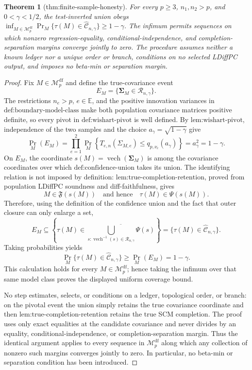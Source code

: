 \documentclass{article}
\newtheorem{theorem}{Theorem}
\begin{document}
\begin{theorem}[thm:finite-sample-honesty]\label{thm:finite-sample-honesty}
For every \(p\ge3\), \(n_1,n_2>p\), and \(0<\gamma<1/2\), the test-inverted union obeys \(\inf_{M\in\mathcal M_p^{\mathrm{df}}}\Pr_M\{\tau(M)\in\widehat{\mathcal C}_{n,\gamma}\}\ge1-\gamma\). The infimum permits sequences on which nonzero regression-equality, conditional-independence, and completion-separation margins converge jointly to zero. The procedure assumes neither a known ledger nor a unique order or branch, conditions on no selected LDiffPC output, and imposes no beta-min or separation margin.
\end{theorem}
\begin{proof}
Fix \(M\in\mathcal M_p^{\mathrm{df}}\) and define the true-covariance event
\[
E_M=\{\boldsymbol\Sigma_M\in\mathcal R_{n,\gamma}\}.
\]
The restrictions \(n_e>p\), \(e\in\mathbb E\), and the positive innovation variances in \(\text{def:boundary-model-class}\) make both population covariance matrices positive definite, so every pivot in \(\text{def:wishart-pivot}\) is well defined.  By \(\text{lem:wishart-pivot}\), independence of the two samples and the choice \(a_\gamma=\sqrt{1-\gamma}\) give
\[
\Pr_M(E_M)
=\prod_{e=1}^2
  \Pr_M\!\left\{T_{e,n}(\Sigma_{M,e})
       \le q_{p,\nu_e}(a_\gamma)\right\}
=a_\gamma^2
=1-\gamma.
\]
On \(E_M\), the coordinate \(s(M)=\operatorname{vech}(\boldsymbol\Sigma_M)\) is among the covariance coordinates over which \(\text{def:confidence-union}\) takes its union.  The identifying relation is not imposed by definition: \(\text{lem:true-completion-retention}\), proved from population LDiffPC soundness and diff-faithfulness, gives
\[
M\in\mathfrak F(s(M))
\quad\text{and hence}\quad
\tau(M)\in\Psi(s(M)).
\]
Therefore, using the definition of the confidence union and the fact that outer closure can only enlarge a set,
\[
E_M
\subseteq
\left\{\tau(M)\in
\overline{\bigcup_{s:\operatorname{vech}^{-1}(s)\in
\mathcal R_{n,\gamma}}\Psi(s)}\right\}
=\{\tau(M)\in\widehat{\mathcal C}_{n,\gamma}\}.
\]
Taking probabilities yields
\[
\Pr_M\{\tau(M)\in\widehat{\mathcal C}_{n,\gamma}\}
\ge \Pr_M(E_M)=1-\gamma.
\]
This calculation holds for every \(M\in\mathcal M_p^{\mathrm{df}}\); hence taking the infimum over that same model class proves the displayed uniform coverage bound.

No step estimates, selects, or conditions on a ledger, topological order, or branch: on the pivotal event the union simply retains the true covariance coordinate and then \(\text{lem:true-completion-retention}\) retains the true SCM completion.  The proof uses only exact equalities at the candidate covariance and never divides by an equality, conditional-independence, or completion-separation margin.  Thus the identical argument applies to every sequence in \(\mathcal M_p^{\mathrm{df}}\) along which any collection of nonzero such margins converges jointly to zero.  In particular, no beta-min or separation condition has been introduced.
\end{proof}
\end{document}
